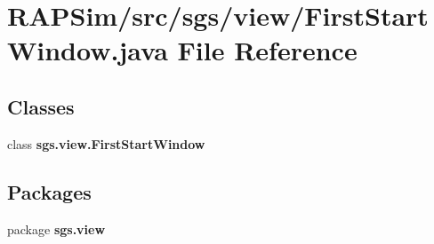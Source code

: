 \section{R\-A\-P\-Sim/src/sgs/view/\-First\-Start\-Window.java File Reference}
\label{_first_start_window_8java}
\subsection*{Classes}
\begin{DoxyCompactItemize}
\item 
class {\bf sgs.\-view.\-First\-Start\-Window}
\end{DoxyCompactItemize}
\subsection*{Packages}
\begin{DoxyCompactItemize}
\item 
package {\bf sgs.\-view}
\end{DoxyCompactItemize}
